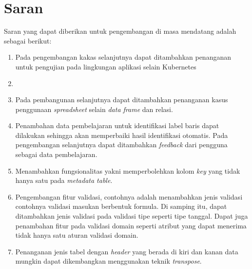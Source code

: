 \section{Saran}
Saran yang dapat diberikan untuk pengembangan di masa mendatang adalah sebagai berikut:
\begin{enumerate}
	\item Pada pengembangan kakas selanjutnya dapat ditambahkan penanganan untuk pengujian pada lingkungan aplikasi selain Kubernetes
	\item 
	
	\item Pada pembangunan selanjutnya dapat ditambahkan penanganan kasus penggunaan \textit{spreadsheet} selain \textit{data frame} dan relasi.
	\item Penambahan data pembelajaran untuk identifikasi label baris dapat dilakukan sehingga akan memperbaiki hasil identifikasi otomatis. Pada pengembangan selanjutnya dapat ditambahkan \textit{feedback} dari pengguna sebagai data pembelajaran.
	\item Menambahkan fungsionalitas yakni memperbolehkan kolom \textit{key} yang tidak hanya satu pada \textit{metadata table}.
	\item Pengembangan fitur validasi, contohnya adalah menambahkan jenis validasi contohnya validasi masukan berbentuk formula. Di samping itu, dapat ditambahkan jenis validasi pada validasi tipe seperti tipe tanggal. Dapat juga penambahan fitur pada validasi domain seperti atribut yang dapat menerima tidak hanya satu aturan validasi domain.
	\item Penanganan jenis tabel dengan \textit{header} yang berada di kiri dan kanan data mungkin dapat dikembangkan menggunakan teknik \textit{transpose}.

\end{enumerate}